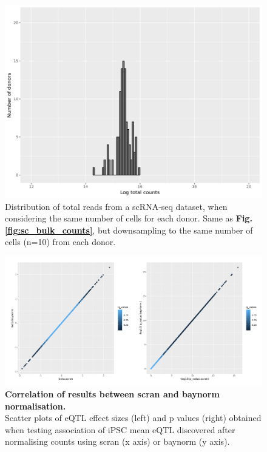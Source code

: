 \begin{figure}[h]
    \centering
    \includegraphics[width=12cm]{Appendix2/Fig/suppl_distribution_fixed_ncells.png}
    \caption[Distribution of total reads scRNA-seq same number of cells per donor]{Distribution of total reads from a scRNA-seq dataset, when considering the same number of cells for each donor.
    Same as \textbf{Fig. \ref{fig:sc_bulk_counts}}, but downsampling to the same number of cells (n=10) from each donor.}
    \label{suppl_fig:counts_sc_ncells}
\end{figure}

\begin{figure}[h]
    \centering
    \includegraphics[width=16cm]{Appendix2/Fig/suppl_scran_vs_baynorm.png}
    \caption[Correlation of results between scran and baynorm normalisation]{\textbf{Correlation of results between scran and baynorm normalisation.}\\
    Scatter plots of eQTL effect sizes (left) and p values (right) obtained when testing association of iPSC mean eQTL discovered after normalising counts using scran (x axis) or baynorm (y axis).}
    \label{suppl_fig:scran_vs_baynorm}
\end{figure}

